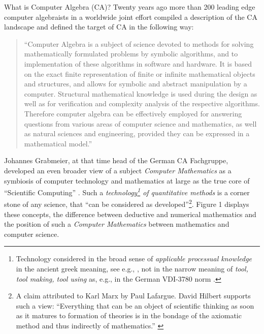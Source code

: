 \documentclass[11pt]{article}
\begin{document}
What is Computer Algebra (CA)? Twenty years ago more than 200 leading edge
computer algebraists in a worldwide joint effort compiled a description of the
CA landscape \cite{CAHB} and defined the target of CA in the following way:
\begin{quote}\small
  ``Computer Algebra is a subject of science devoted to methods for solving
  mathematically formulated problems by symbolic algorithms, and to
  implementation of these algorithms in software and hardware. It is based on
  the exact finite representation of finite or infinite mathematical objects
  and structures, and allows for symbolic and abstract manipulation by a
  computer. Structural mathematical knowledge is used during the design as well
  as for verification and complexity analysis of the respective algorithms.
  Therefore computer algebra can be effectively employed for answering
  questions from various areas of computer science and mathematics, as well as
  natural sciences and engineering, provided they can be expressed in a
  mathematical model.'' \cite[p. 2]{CAHB}
\end{quote}
Johannes Grabmeier, at that time head of the German CA Fachgruppe,
developed an even broader view of a subject \emph{Computer Mathematics} as a
symbiosis of computer technology and mathematics at large as the true core of
``Scientific Computing'' \cite{Grabmeier95}. Such a
\emph{technology\footnote{Technology considered in the broad sense of
    \emph{applicable processual knowledge} in the ancient greek meaning, see
    e.g., \cite{TechnologyWikipedia}, not in the narrow meaning of \emph{tool,
      tool making, tool using} as, e.g., in the German VDI-3780 norm
    \cite{VDI-Richtlinie}.}  of quantitative methods} is a corner stone of any
science, that ``can be considered as developed''\footnote{A claim attributed to
  Karl Marx by Paul Lafargue. David Hilbert supports such a view: ``Everything
  that can be an object of scientific thinking as soon as it matures to
  formation of theories is in the bondage of the axiomatic method and thus
  indirectly of mathematics.''  \cite{Hilbert} }.  Figure 1 displays these
concepts, the difference between deductive and numerical mathematics and the
position of such a \emph{Computer Mathematics} between mathematics and computer
science.
\end{document}
